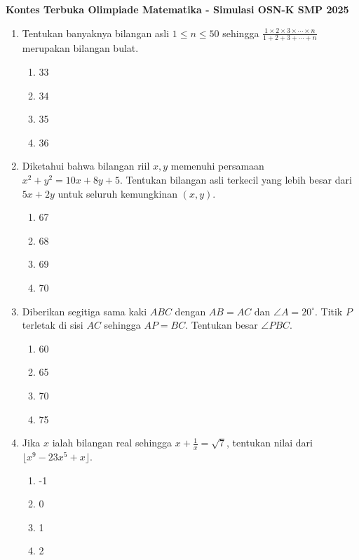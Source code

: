 \documentclass[12pt]{scrartcl}
\begin{document}
\renewcommand*\contentsname{Daftar Isi}
\tableofcontents

\newpage

\begin{center}
    \textbf{\Large Kontes Terbuka Olimpiade Matematika - Simulasi OSN-K SMP 2025}
\end{center}

\vspace{0.5cm}

\begin{enumerate}

    \item Tentukan banyaknya bilangan asli $1 \le n \le 50$ sehingga 
    $\frac{1\times2\times3\times\cdots\times n}{1+2+3+\cdots+n}$ 
    merupakan bilangan bulat.
    \begin{enumerate}
        \item 33
        \item 34
        \item 35
        \item 36
    \end{enumerate}

    \item Diketahui bahwa bilangan riil $x, y$ memenuhi persamaan $x^{2}+y^{2}=10x+8y+5$. Tentukan bilangan asli terkecil yang lebih besar dari $5x+2y$ untuk seluruh kemungkinan $(x, y)$.
    \begin{enumerate}
        \item 67
        \item 68
        \item 69
        \item 70
    \end{enumerate}

    \item Diberikan segitiga sama kaki $ABC$ dengan $AB=AC$ dan $\angle A=20^{\circ}$. Titik $P$ terletak di sisi $AC$ sehingga $AP=BC$. Tentukan besar $\angle PBC$.
    \begin{enumerate}
        \item 60
        \item 65
        \item 70
        \item 75
    \end{enumerate}

    \item Jika $x$ ialah bilangan real sehingga $x+\frac{1}{x}=\sqrt{7}$, tentukan nilai dari $\lfloor x^{9}-23x^{5}+x \rfloor$.
    \begin{enumerate}
        \item -1
        \item 0
        \item 1
        \item 2
    \end{enumerate}


\end{enumerate}
\end{document}
